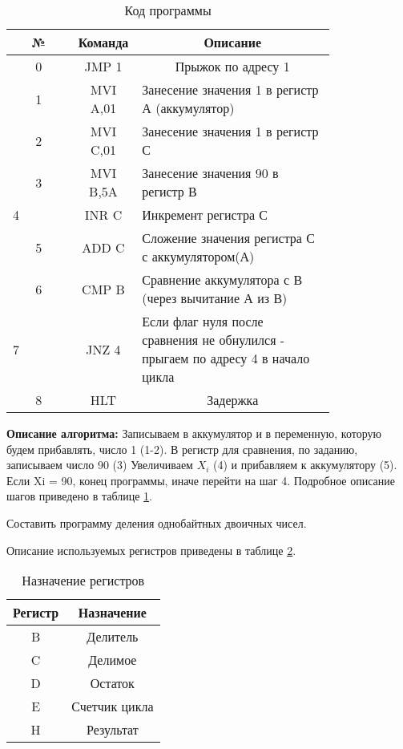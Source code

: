 \documentclass[a4paper,14pt]{extarticle}
\begin{document}
\begin{problem*}
\begin{table}[h!]
	\centering
	\caption{Код программы}
	\begin{tabular}{|c|m{0.2\linewidth}|p{0.6\linewidth}|}
		\hline
		№ & \multicolumn{1}{c|}{Команда} & \multicolumn{1}{c|}{Описание} \\ \hline
		0 & \multicolumn{1}{c|}{JMP 1} & \multicolumn{1}{c|}{Прыжок по адресу 1} \\ \hline
		1 & \multicolumn{1}{c|}{MVI A,01} & Занесение значения 1 в регистр А (аккумулятор) \\ \hline
		\multicolumn{1}{|c|}{2} & \multicolumn{1}{c|}{MVI C,01} & Занесение значения 1 в регистр С \\ \hline
		3 &\multicolumn{1}{c|}{MVI B,5A} & Занесение значения 90 в регистр В \\ \hline
		\multicolumn{1}{|l|}{4} & \multicolumn{1}{c|}{
			INR C} & Инкремент регистра С \\ \hline
		5 & \multicolumn{1}{c|}{ADD C} & Сложение значения регистра С с аккумулятором(А) \\ \hline
		6 & \multicolumn{1}{c|}{CMP B} & Сравнение аккумулятора с В (через вычитание А из В) \\ \hline
		\multicolumn{1}{|l|}{7} & \multicolumn{1}{c|}{JNZ 4}  & {Если флаг нуля после сравнения не обнулился - прыгаем по адресу 4 в начало цикла} \\ \hline
		8 & \multicolumn{1}{c|}{HLT} & \multicolumn{1}{c|}{Задержка} \\ \hline
	\end{tabular}
	\label{tab:code}
\end{table}
\textbf{Описание алгоритма:}
Записываем в аккумулятор и в переменную, которую будем прибавлять, число 1 (1-2). В регистр для сравнения, по заданию, записываем число 90 (3) Увеличиваем $X_i$ (4) и прибавляем к аккумулятору (5). Если Xi = 90, конец
программы, иначе перейти на шаг 4. Подробное описание шагов приведено в таблице \ref{tab:code}.
\newpage
\end{problem*}

\begin{problem*}
	Составить программу деления однобайтных двоичных чисел.
	
	\nonum
\end{problem*}
Описание используемых регистров приведены в таблице \ref{tab:registers2}.
\begin{table}[h!]
	\centering
	\caption{Назначение регистров}
	\begin{tabular}{|c|c|}
		\hline
		Регистр & Назначение \\ \hline
		B & Делитель \\ \hline
		C & Делимое \\ \hline
		D & Остаток \\ \hline
		E & \multicolumn{1}{l|}{Счетчик цикла} \\ \hline
		H & Результат \\ \hline
	\end{tabular}
	\label{tab:registers2}
\end{table}
\end{document}
